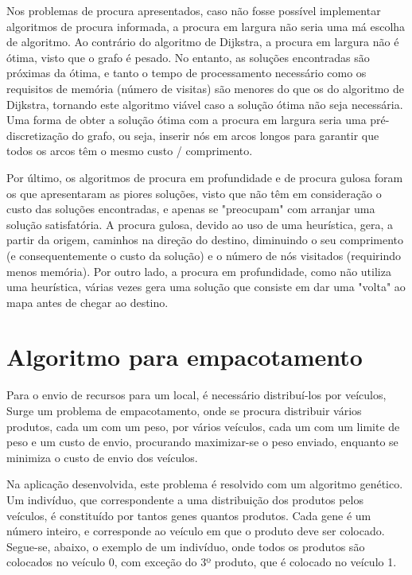 \documentclass[12pt, a4paper]{article}
\begin{document}
Nos problemas de procura apresentados, caso não fosse possível implementar algoritmos de procura
informada, a procura em largura não seria uma má escolha de algoritmo. Ao contrário do algoritmo de
Dijkstra, a procura em largura não é ótima, visto que o grafo é pesado. No entanto, as soluções
encontradas são próximas da ótima, e tanto o tempo de processamento necessário como os requisitos de
memória (número de visitas) são menores do que os do algoritmo de Dijkstra, tornando este algoritmo
viável caso a solução ótima não seja necessária. Uma forma de obter a solução ótima com a procura em
largura seria uma pré-discretização do grafo, ou seja, inserir nós em arcos longos para garantir que
todos os arcos têm o mesmo custo / comprimento.

Por último, os algoritmos de procura em profundidade e de procura gulosa foram os que apresentaram
as piores soluções, visto que não têm em consideração o custo das soluções encontradas, e apenas se
"preocupam"{} com arranjar uma solução satisfatória. A procura gulosa, devido ao uso de uma
heurística, gera, a partir da origem, caminhos na direção do destino, diminuindo o seu comprimento
(e consequentemente o custo da solução) e o número de nós visitados (requirindo menos memória). Por
outro lado, a procura em profundidade, como não utiliza uma heurística, várias vezes gera uma
solução que consiste em dar uma "volta"{} ao mapa antes de chegar ao destino.

\section{Algoritmo para empacotamento}

Para o envio de recursos para um local, é necessário distribuí-los por veículos, Surge um problema
de empacotamento, onde se procura distribuir vários produtos, cada um com um peso, por vários
veículos, cada um com um limite de peso e um custo de envio, procurando maximizar-se o peso enviado,
enquanto se minimiza o custo de envio dos veículos.

Na aplicação desenvolvida, este problema é resolvido com um algoritmo genético. Um indivíduo, que
correspondente a uma distribuição dos produtos pelos veículos, é constituído por tantos genes
quantos produtos. Cada gene é um número inteiro, e corresponde ao veículo em que o produto deve ser
colocado. Segue-se, abaixo, o exemplo de um indivíduo, onde todos os produtos são colocados no
veículo 0, com exceção do 3º produto, que é colocado no veículo 1.
\end{document}
